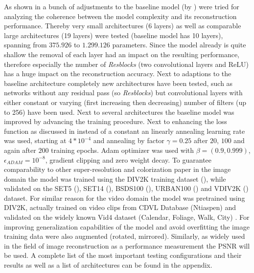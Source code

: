 As shown in  a bunch of adjustments to the
baseline model (by \cite{TAID}) were tried for analyzing the coherence between the model complexity and its reconstruction performance. Thereby very small architectures (6 layers) as well as comparable large architectures (19 layers) were tested (baseline model has 10 layers), spanning from $375.926$ to $1.299.126$ parameters. Since the model already is quite shallow the removal of each layer had an impact on the resulting performance, therefore especially the number of \textit{Resblocks} (two convolutional layers and ReLU) has a huge impact on the reconstruction accuracy. Next to adaptions to the baseline architecture completely new architectures have been tested, such as networks without any residual pass (so \textit{Resblocks}) but convolutional layers with either constant or varying (first increasing then decreasing) number of filters (up to 256) have been used.
\newline
Next to several architectures the baseline model was improved by advancing the training procedure. Next to enhancing the loss function as discussed in  instead of a constant an linearly annealing learning rate was used, starting at $4*10^{-4}$ and annealing by factor $\gamma = 0.25$ after $20$, $100$ and again after $200$ training epochs. Adam optimizer was used with $\beta = (0.9, 0.999)$, $\epsilon_{ADAM} = 10^{-8}$, gradient clipping and zero weight decay.
\newline
To guarantee comparability to other super-resolution and colorization paper in the image domain the model was trained using the DIV2K training dataset (\cite{DIV2K}), while validated on the SET5 (\cite{SET5}), SET14 (\cite{SET14}), BSDS100 (\cite{BSDS100}), URBAN100 (\cite{URBAN100}) and VDIV2K (\cite{DIV2K}) dataset. For similar reason for the video domain the model was pretrained using DIV2K, actually trained on video clips from CDVL Database (Ntiaspen) and validated on the widely known Vid4 dataset (Calendar, Foliage, Walk, City) \cite{Vid4}. For improving generalization capabilities of the model and avoid overfitting the image training data were also augmented (rotated, mirrored).
\newline
Similarly, as widely used in the field of image reconstruction as a performance measurement the \ac{PSNR} will be used.
\newline
A complete list of the most important testing configurations and their results as well as a list of architectures can be found in the appendix.

